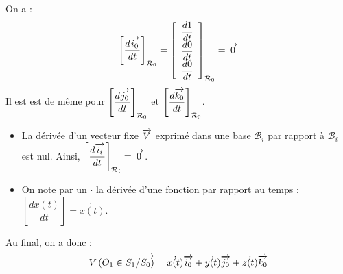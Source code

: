 \documentclass[10pt,oneside]{article}
\begin{document}
On a : 
$$
\left[\dfrac{d\overrightarrow{i_0}}{dt}\right]_{\mathcal{R}_0} = 
\left[
\begin{array}{c}
\dfrac{d 1}{dt}\\
\dfrac{d 0}{dt}\\
\dfrac{d  0}{dt}\\
\end{array}
\right]_{\mathcal{R}_0}
 = \overrightarrow{0}
$$
Il est est de même pour $\left[\dfrac{d\overrightarrow{j_0}}{dt}\right]_{\mathcal{R}_0}$ et $\left[\dfrac{d\overrightarrow{k_0}}{dt}\right]_{\mathcal{R}_0}$.

\begin{rem}
\begin{itemize}
\item La dérivée d'un vecteur fixe $\overrightarrow{V}$ exprimé dans une base $\mathcal{B}_i$ par rapport à $\mathcal{B}_i$ est nul. Ainsi,  $\left[\dfrac{d\overrightarrow{i_i}}{dt}\right]_{\mathcal{R}_i}=\overrightarrow{0}$.
\item On note par un $\cdot$ la dérivée d'une fonction par rapport au temps : $\left[\dfrac{dx(t)}{dt}\right] = \dot{x(t)}$.
\end{itemize}

\end{rem}

Au final, on a donc :
$$\overrightarrow{V\left( {O_1} \in {S_1}/{S_0}\right)} = \dot{x(t)} \overrightarrow{i_0}+\dot{y(t)} \overrightarrow{j_0}+\dot{z(t)} \overrightarrow{k_0} $$
\end{document}
